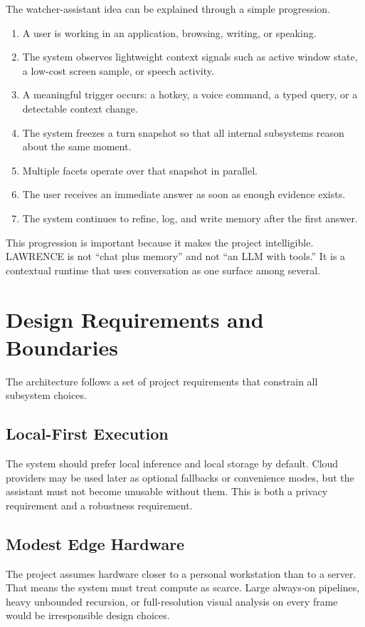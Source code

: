 \documentclass[conference]{IEEEtran}
\begin{document}
The watcher-assistant idea can be explained through a simple progression.

\begin{enumerate}
\item A user is working in an application, browsing, writing, or speaking.
\item The system observes lightweight context signals such as active window state, a low-cost screen sample, or speech activity.
\item A meaningful trigger occurs: a hotkey, a voice command, a typed query, or a detectable context change.
\item The system freezes a turn snapshot so that all internal subsystems reason about the same moment.
\item Multiple facets operate over that snapshot in parallel.
\item The user receives an immediate answer as soon as enough evidence exists.
\item The system continues to refine, log, and write memory after the first answer.
\end{enumerate}

This progression is important because it makes the project intelligible. LAWRENCE is not ``chat plus memory'' and not ``an LLM with tools.'' It is a contextual runtime that uses conversation as one surface among several.

\section{Design Requirements and Boundaries}
The architecture follows a set of project requirements that constrain all subsystem choices.

\subsection{Local-First Execution}
The system should prefer local inference and local storage by default. Cloud providers may be used later as optional fallbacks or convenience modes, but the assistant must not become unusable without them. This is both a privacy requirement and a robustness requirement.

\subsection{Modest Edge Hardware}
The project assumes hardware closer to a personal workstation than to a server. That means the system must treat compute as scarce. Large always-on pipelines, heavy unbounded recursion, or full-resolution visual analysis on every frame would be irresponsible design choices.
\end{document}
